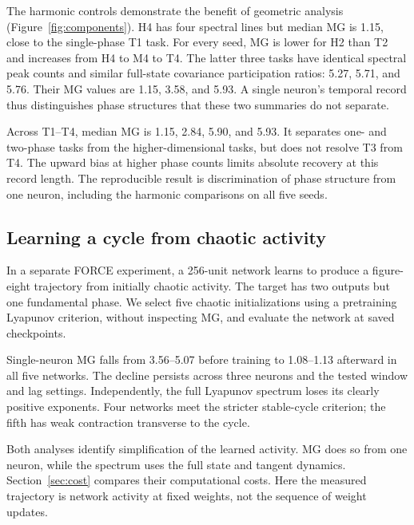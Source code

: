 {The harmonic controls demonstrate the benefit of geometric analysis (Figure~\ref{fig:components}). H4 has four spectral lines but median MG is 1.15, close to the single-phase T1 task. For every seed, MG is lower for H2 than T2 and increases from H4 to M4 to T4. The latter three tasks have identical spectral peak counts and similar full-state covariance participation ratios: 5.27, 5.71, and 5.76. Their MG values are 1.15, 3.58, and 5.93. A single neuron's temporal record thus distinguishes phase structures that these two summaries do not separate.

Across T1--T4, median MG is 1.15, 2.84, 5.90, and 5.93. It separates one- and two-phase tasks from the higher-dimensional tasks, but does not resolve T3 from T4. The upward bias at higher phase counts limits absolute recovery at this record length. The reproducible result is discrimination of phase structure from one neuron, including the harmonic comparisons on all five seeds.

\subsection{Learning a cycle from chaotic activity}\label{sec:force}
In a separate FORCE experiment, a 256-unit network learns to produce a figure-eight trajectory from initially chaotic activity. The target has two outputs but one fundamental phase. We select five chaotic initializations using a pretraining Lyapunov criterion, without inspecting MG, and evaluate the network at saved checkpoints.

Single-neuron MG falls from 3.56--5.07 before training to 1.08--1.13 afterward in all five networks. The decline persists across three neurons and the tested window and lag settings. Independently, the full Lyapunov spectrum loses its clearly positive exponents. Four networks meet the stricter stable-cycle criterion; the fifth has weak contraction transverse to the cycle.

Both analyses identify simplification of the learned activity. MG does so from one neuron, while the spectrum uses the full state and tangent dynamics. Section~\ref{sec:cost} compares their computational costs. Here the measured trajectory is network activity at fixed weights, not the sequence of weight updates.
}
